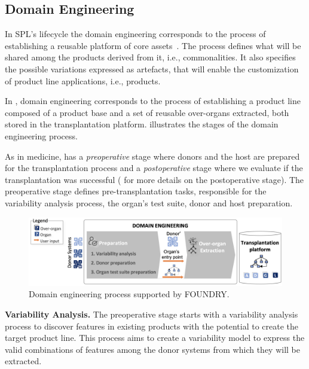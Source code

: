 \subsection{Domain Engineering}

In SPL's lifecycle the domain engineering corresponds to the process of establishing a reusable platform of core assets~\cite{Clements2001}. The process defines what will be shared among the products derived from it, i.e., commonalities. It also specifies the possible variations expressed as artefacts, that will enable the customization of product line applications, i.e., products.

In \FOUNDRY, domain engineering corresponds to the process of establishing a product line composed of a product base and a set of reusable over-organs extracted, both stored in the transplantation platform.  illustrates the stages of the domain engineering process. 

As in medicine, \FOUNDRY has a \emph{preoperative} stage where donors and the host are prepared for the transplantation process and a \emph{postoperative} stage where we evaluate if the transplantation was successful ( for more details on the postoperative stage). The preoperative stage defines pre-transplantation tasks, responsible for the variability analysis process, the organ's test suite, donor and host preparation.

\begin{figure}[t]
	\centering  \includegraphics[width=\linewidth]{images/FOUNDRY_DOM6.png}
	\centering \caption{Domain engineering process supported by FOUNDRY.  }
	\label{fig:foundry_dom}
\end{figure} 



\textbf{Variability Analysis.} The preoperative stage starts with a variability analysis process to discover features in existing products with the potential to create the target product line. This process aims to create a variability model to express the valid combinations of features among the donor systems from which they will be extracted.  

